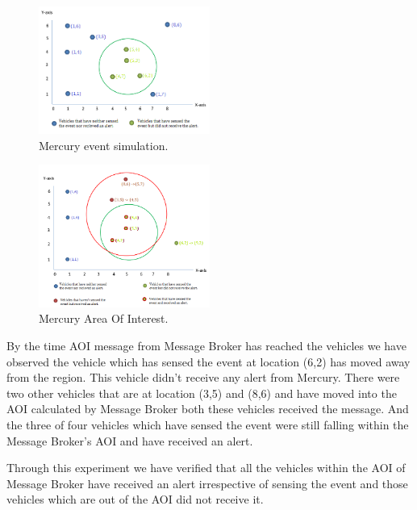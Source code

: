 \begin{figure}[ht]
  \begin{center}
    \includegraphics[width=0.5\textwidth]{figs/simulated.png}
    \caption{Mercury event simulation.}
    \label{fig:simulated}
  \end{center}
\end{figure}

\begin{figure}[ht]
  \begin{center}
    \includegraphics[width=0.5\textwidth]{figs/aoi.png}
    \caption{Mercury Area Of Interest.}
    \label{fig:aoi}
  \end{center}
\end{figure}

By the time AOI message from Message Broker has reached the vehicles
we have observed the vehicle which has sensed the event at location
(6,2) has moved away from the region. This vehicle didn’t receive any
alert from Mercury.  There were two other vehicles that are at
location (3,5) and (8,6) and have moved into the AOI calculated by
Message Broker both these vehicles received the message. And the three
of four vehicles which have sensed the event were still falling within
the Message Broker’s AOI and have received an alert.
   
Through this experiment we have verified that all the vehicles within the
AOI of Message Broker have received an alert irrespective of sensing
the event and those vehicles which are out of the AOI did not receive it.

